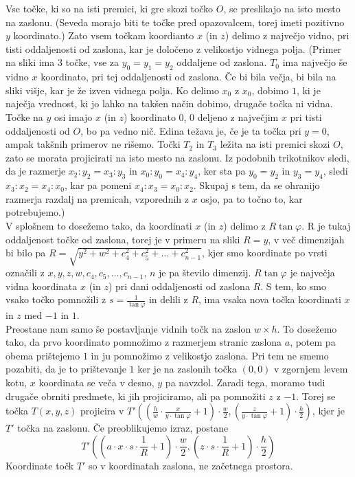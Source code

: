 \documentclass[a4paper, 12px]{article}
\begin{document}
    Vse točke, ki so na isti premici, ki gre skozi točko $O$, se preslikajo na isto mesto na zaslonu.
    (Seveda morajo biti te točke pred opazovalcem, torej imeti pozitivno $y$ koordinato.)
    Zato vsem točkam koordianto $x$ (in $z$) delimo z največjo vidno, pri tisti oddaljenosti od zaslona, kar je
    določeno z velikostjo vidnega polja.
    (Primer na sliki ima 3 točke, vse za $y_0 = y_1 = y_2$ oddaljene od zaslona. $T_0$ ima največjo še vidno $x$
    koordinato, pri tej oddaljenosti od zaslona. Če bi bila večja, bi bila na sliki višje, kar je že izven vidnega polja.
    Ko delimo $x_0$ z $x_0$, dobimo $1$, ki je naječja vrednost, ki jo lahko na takšen način dobimo, drugače točka ni vidna.
    Točke na $y$ osi imajo $x$ (in $z$) koordinato $0$, $0$ deljeno z največjim $x$ pri tisti oddaljenosti od $O$, 
    bo pa vedno nič. Edina težava je, če je ta točka pri $y = 0$, ampak takšnih primerov ne rišemo.
    Točki $T_2$ in $T_3$ ležita na isti premici skozi $O$, zato se morata projicirati na isto mesto na zaslonu.
    Iz podobnih trikotnikov sledi, da je razmerje $x_2 : y_2 = x_3 : y_3$ in $x_0 : y_0 = x_4 : y_4$,
    ker sta pa $y_0 = y_2$ in $y_3 = y_4$, sledi $x_3 : x_2 = x_4 : x_0$, kar pa pomeni $x_4 : x_3 = x_0 : x_2$.
    Skupaj s tem, da se ohranijo razmerja razdalj na premicah, vzporednih z $x$ osjo, pa to točno to, kar potrebujemo.)\\

    V splošnem to dosežemo tako, da koordinati $x$ (in $z$) delimo z $R\tan{\varphi}$. R je tukaj oddaljenost točke od zaslona,
    torej je v primeru na sliki $R = y$, v več dimenzijah bi bilo pa $R = \sqrt{y^2 + w^2 + c_4^2 + c_5^2 + \dots + c_{n-1}^2}$,
    kjer smo koordinate po vrsti označili z $x, y, z, w, c_4, c_5, \dots, c_{n-1}$, $n$ je pa število dimenzij.
    $R\tan{\varphi}$ je največja vidna koordinata $x$ (in $z$) pri dani oddaljenosti od zaslona $R$.
    S tem, ko smo vsako točko pomnožili z $s = \frac{1}{\tan{\varphi}}$ in delili z $R$, ima vsaka nova točka koordinati $x$ in $z$ med $-1$ in $1$. \\

    Preostane nam samo še postavljanje vidnih točk na zaslon $w \times h$. To dosežemo tako, da prvo koordinato pomnožimo
    z razmerjem stranic zaslona $a$, potem pa obema prištejemo $1$ in ju pomnožimo z velikostjo zaslona. Pri tem ne smemo
    pozabiti, da je to prištevanje $1$ ker je na zaslonih točka $\left(0, 0\right)$ v zgornjem levem kotu, $x$ koordinata
    se veča v desno, $y$ pa navzdol. Zaradi tega, moramo tudi drugače obrniti predmete, ki jih projiciramo, ali pa pomnožiti
    $z$ z $-1$. Torej se točka $T\left(x, y, z\right)$ projicira v 
    $T'\left(\left(\frac{h}{w} \cdot \frac{x}{y \cdot \tan{\varphi}} + 1\right) \cdot \frac{w}{2},
    \left(\frac{z}{y \cdot \tan{\varphi}} + 1\right) \cdot \frac{h}{2} \right)$, 
    kjer je $T'$ točka na zaslonu. Če preoblikujemo izraz, postane 
    $$T'\left(\left(a \cdot x \cdot s \cdot \frac{1}{R} + 1\right) \cdot \frac{w}{2},
    \left(z \cdot s \cdot \frac{1}{R} + 1\right) \cdot \frac{h}{2} \right)$$
    Koordinate točk $T'$ so v koordinatah zaslona, ne začetnega prostora.
    \cite{ProjectionVideo}
\end{document}
